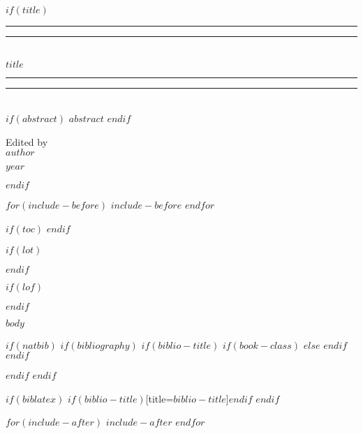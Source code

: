 \documentclass[
$if(fontsize)$
  $fontsize$,
$endif$
$if(lang)$
  $lang$,
$endif$
$if(papersize)$
  $papersize$,
$endif$
$for(classoption)$
  $classoption$$sep$,
$endfor$
]{$documentclass$}
\providecommand*{\titleGP}{
\begingroup
\centering %
\vspace*{\baselineskip} %

\rule{\textwidth}{1.6pt}\vspace*{-\baselineskip}\vspace*{2pt} %
\rule{\textwidth}{0.4pt}\\[\baselineskip] %

{$title$} \leavevmode\\[0.2\baselineskip] %

\rule{\textwidth}{0.4pt}\vspace*{-\baselineskip}\vspace{3.2pt} %
\rule{\textwidth}{1.6pt}\\[\baselineskip] %

\scshape %
$if(abstract)$
$abstract$
$endif$
\vspace*{2\baselineskip} %

Edited by  \leavevmode\\[\baselineskip]
{\Large $author$} %

\vfill* %

{\scshape }$year$ \\[0.3\baselineskip] %
\endgroup
}
\newcommand\blankpage{%
    \null
    \thispagestyle{empty}%
    \addtocounter{page}{-1}%
    \newpage}
\begin{document}
$if(title)$
\titleGP
\thispagestyle{empty}
\blankpage
$endif$

$for(include-before)$
$include-before$
$endfor$


$if(toc)$
\break
\break
{
\hypersetup{linkcolor=$if(toccolor)$$toccolor$$else$black$endif$}
\setcounter{tocdepth}{$toc-depth$}
\tableofcontents
}
$endif$

$if(lot)$
\listoftables
$endif$

$if(lof)$
\listoffigures
$endif$

$body$

$if(natbib)$
  $if(bibliography)$
    $if(biblio-title)$
      $if(book-class)$
        \renewcommand\bibname{$biblio-title$}
      $else$
        \renewcommand\refname{$biblio-title$}
      $endif$
    $endif$
      
  $endif$
$endif$

$if(biblatex)$
\printbibliography$if(biblio-title)$[title=$biblio-title$]$endif$
$endif$


$for(include-after)$
$include-after$
$endfor$


\end{document}
